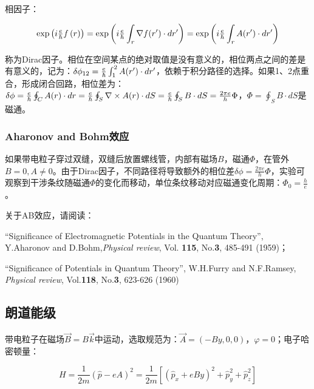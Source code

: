 相因子：

\begin{equation*}
\exp \left( {i{\textstyle{e \over \hbar }}f\left( r \right)} \right) = \exp \left( {i{\textstyle{e \over \hbar }}\int_r {\nabla f(r') \cdot dr'} } \right) = \exp \left( {i{\textstyle{e \over \hbar }}\int_r {A(r') \cdot dr'} } \right)
\end{equation*}

称为Dirac因子。相位在空间某点的绝对取值是没有意义的，相位两点之间的差是有意义的，记为：$\delta \phi _{12}  = {\textstyle{e \over \hbar }}\int_1^2 {A(r') \cdot dr'} $，依赖于积分路径的选择。如果1、2点重合，形成闭合回路，相位差为：$\delta \phi  = {\textstyle{e \over \hbar }}\oint_C {A(r) \cdot dr}  = {\textstyle{e \over \hbar }}\oint_S {\nabla  \times A(r) \cdot dS}  = {\textstyle{e \over \hbar }}\oint_S {B \cdot dS}  = \frac{{2\pi e}}{h}\Phi $，$\Phi  = \oint_S {B \cdot dS} $是磁通。

\subsubsection{Aharonov and Bohm效应}

如果带电粒子穿过双缝，双缝后放置螺线管，内部有磁场$B$，磁通$\Phi$，在管外$B = 0,A \ne 0$。由于Dirac因子，不同路径将导致额外的相位差$\delta \phi  = \frac{{2\pi e}}{h}\Phi $，实验可观察到干涉条纹随磁通$\Phi$的变化而移动，单位条纹移动对应磁通变化周期：$\Phi _0  = \frac{h}{e}$。

关于AB效应，请阅读：

``Significance of Electromagnetic Potentials in the Quantum Theory'', Y.Aharonov and D.Bohm,\emph{Physical review}, Vol. \textbf{115}, No.\textbf{3}, 485-491 (1959)；

``Significance of Potentials in Quantum Theory'', W.H.Furry and N.F.Ramsey, \emph{Physical review}, Vol.\textbf{118}, No.\textbf{3}, 623-626 (1960)


\subsection{朗道能级}


带电粒子在磁场$\vec B = B\vec k$中运动，选取规范为：$\vec A = \left( { - By,0,0} \right)$，$\varphi = 0$；电子哈密顿量：

\begin{equation}
H = \frac{1}{{2m}}\left( {\widehat p - eA} \right)^2  = \frac{1}{{2m}}\left[ {\left( {\widehat p_x  + eBy} \right)^2  + \widehat p_y^2  + \widehat p_z^2 } \right]
\end{equation}


